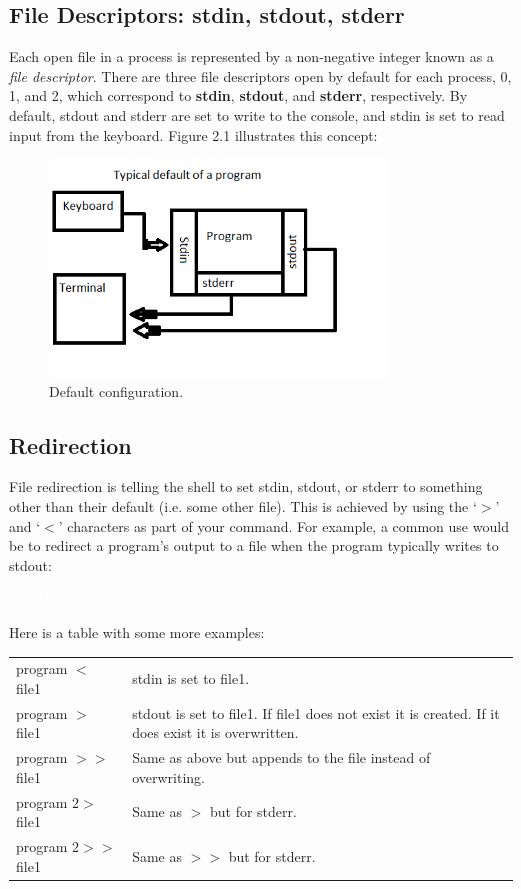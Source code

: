 \documentclass[oneside]{book}
\newcommand{\commandline}[1]{\begin{center} \colorbox{Dark}{\textcolor{white}{#1}} \end{center}}
\begin{document}
    \subsection{File Descriptors: stdin, stdout, stderr}
        Each open file in a process is represented by a non-negative integer known as a \textit{file descriptor}. There are three file descriptors open by default for each process, 0, 1, and 2, which correspond to \textbf{stdin}, \textbf{stdout}, and \textbf{stderr}, respectively. By default, stdout and stderr are set to write to the console, and stdin is set to read input from the keyboard. Figure 2.1 illustrates this concept:
        
        \begin{figure}[H]
        	\centering
        	\label{tab:directory_tree}
        	\includegraphics[width=90mm]{stdin_err_out_example.png}
        	\caption{Default configuration.}
        \end{figure}        
     
    \subsection{Redirection}
        File redirection is telling the shell to set stdin, stdout, or stderr to something other than their default (i.e. some other file). This is achieved by using the `$>$' and `$<$' characters as part of your command. For example, a common use would be to redirect a program's output to a file when the program typically writes to stdout:
        \commandline{java HelloWold.java $>$ output.txt}
        \vspace{0.3cm}
        Here is a table with some more examples:
        \begin{center}
            \begin{tabular}{|l|l|}
                 \hline
                 program $<$ file1 & stdin is set to file1. \\
                 program $>$ file1 & stdout is set to file1. If file1 does not exist it is created. If it does exist it is overwritten. \\
                 program $>>$ file1 & Same as above but appends to the file instead of overwriting. \\
                 program $2>$ file1 & Same as $>$ but for stderr. \\
                 program $2>>$ file1 & Same as $>>$ but for stderr. \\ \hline
            \end{tabular}
        \end{center}
        
\end{document}

